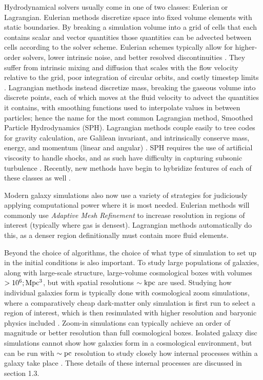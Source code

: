 Hydrodynamical solvers usually come in one of two classes: Eulerian or
Lagrangian.  Eulerian methods discretize space into fixed volume elements with
static boundaries.  By breaking a simulation volume into a grid of cells that
each contains scalar and vector quantities those quantities can be advected
between cells according to the solver scheme.  Eulerian schemes typically allow
for higher-order solvers, lower intrinsic noise, and better resolved
discontinuities \citep{Teyssier2002,Stone2008,Bryan2014}.  They suffer from
intrinsic mixing and diffusion that scales with the flow velocity relative to
the grid, poor integration of circular orbits, and costly timestep limits
\citep{Agertz2007,Tasker2008}.  Lagrangian methods instead discretize mass,
breaking the gaseous volume into discrete points, each of which moves at the
fluid velocity to advect the quantities it contains, with smoothing functions
used to interpolate values in between particles; hence the name for the most
common Lagrangian method, Smoothed Particle Hydrodynamics (SPH).  Lagrangian
methods couple easily to tree codes for gravity calculation, are Galilean
invariant, and intrinsically conserve mass, energy, and momentum (linear and
angular) \citep{Katz1996,Wadsley2004,Springel2005}.  SPH requires the use of
artificial viscosity to handle shocks, and as such have difficulty in capturing
subsonic turbulence \citep{Bauer2012}. Recently, new methods have begin to
hybridize features of each of these classes as well
\citep{Springel2010,Hopkins2015}. 

Modern galaxy simulations also now use a variety of strategies for judiciously
applying computational power where it is most needed.  Eulerian methods will
commonly use \textit{Adaptive Mesh Refinement} to increase resolution in regions
of interest (typically where gas is densest).  Lagrangian methods automatically
do this, as a denser region definitionally must contain more fluid elements.  

Beyond the choice of algorithms, the choice of what type of simulation to set
up in the initial conditions is also important.  To study large populations of
galaxies, along with large-scale structure, large-volume cosmological boxes
with volumes $>10^6;\rm{Mpc^3}$, but with spatial resolutions $\sim \rm{kpc}$
are used.  Studying how individual galaxies form is typically done with
cosmological zoom simulations, where a comparatively cheap dark-matter only
simulation is first run to select a region of interest, which is then
resimulated with higher resolution and baryonic physics included
\citep{Navarro1993}. Zoom-in simulations can typically achieve an order of
magnitude or better resolution than full cosmological boxes.  Isolated galaxy
disc simulations cannot show how galaxies form in a cosmological environment,
but can be run with $\sim \rm{pc}$ resolution to study closely how internal
processes within a galaxy take place \citep{Hopkins2011,Benincasa2016}.  
These details of these internal processes are discussed in section 1.3.

